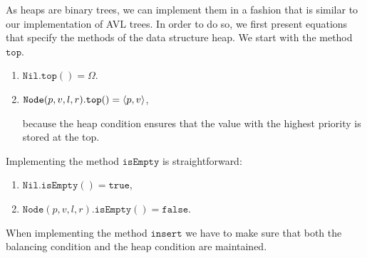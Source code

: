 As heaps are binary trees, we can implement them in a fashion that is similar to our implementation
of AVL trees.  In order to do so, we first present equations that specify the methods of the data
structure heap.  We start with the method $\mathtt{top}$.  
\begin{enumerate}
\item $\mathtt{Nil}.\mathtt{top}() = \Omega$.
\item $\mathtt{Node}(p,v,l,r).\mathtt{top}() = \pair(p,v)$,

      because the heap condition ensures that the value with the highest priority is stored at the
      top. 
\end{enumerate}
Implementing the method $\mathtt{isEmpty}$ is straightforward:
\begin{enumerate}
\item $\mathtt{Nil}.\mathtt{isEmpty}() = \mathtt{true}$,
\item $\mathtt{Node}(p,v,l,r).\mathtt{isEmpty}() = \mathtt{false}$.
\end{enumerate}
When  implementing the method $\mathtt{insert}$ we have to make sure that both the balancing condition
and the heap condition are maintained.
